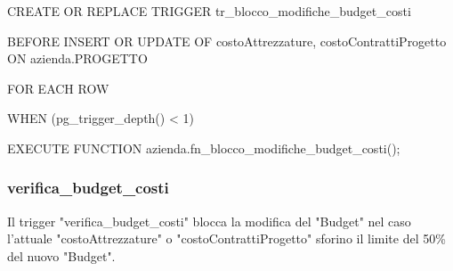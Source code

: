     \ttfamily
        \begin{flushleft}
            \begin{description}
                \item CREATE OR REPLACE TRIGGER tr\_blocco\_modifiche\_budget\_costi
                \item BEFORE INSERT OR UPDATE OF costoAttrezzature, costoContrattiProgetto ON azienda.PROGETTO
                \item FOR EACH ROW
                \item WHEN (pg\_trigger\_depth() < 1)
                \item EXECUTE FUNCTION azienda.fn\_blocco\_modifiche\_budget\_costi();
            \end{description}
        \end{flushleft}
    \normalfont

\newpage

    \subsubsection{verifica\_budget\_costi}
    Il trigger "verifica\_budget\_costi" blocca la modifica del "Budget" nel caso l'attuale "costoAttrezzature" o "costoContrattiProgetto" sforino il limite del 50\% del nuovo "Budget".

